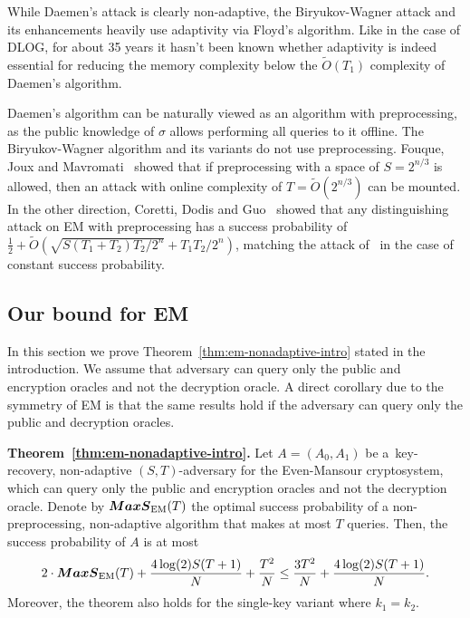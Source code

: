 \documentclass[11pt]{article}
\newcommand{\MAXS}{\boldsymbol{MaxS}}
\begin{document}
While Daemen's attack is clearly non-adaptive, the Biryukov-Wagner attack and its enhancements heavily use adaptivity via Floyd's algorithm. Like in the case of DLOG, for about 35 years it hasn't been known whether adaptivity is indeed essential for reducing the memory complexity below the $\tilde{O}(T_1)$ complexity of Daemen's algorithm. 

Daemen's algorithm can be naturally viewed as an algorithm with preprocessing, as the public knowledge of $\sigma$ allows performing all queries to it offline. The Biryukov-Wagner algorithm and its variants do not use preprocessing. Fouque, Joux and Mavromati~\cite{FouqueJM14} showed that if preprocessing with a space of $S=2^{n/3}$ is allowed, then an attack with online complexity of $T=\tilde{O}(2^{n/3})$ can be mounted. In the other direction, Coretti, Dodis and Guo~\cite{CorettiDG18} showed that any distinguishing attack on EM with preprocessing has a success probability of $\frac{1}{2}+ \tilde{O}(\sqrt{S(T_1+T_2)T_2/2^n}+T_1 T_2/2^n)$, matching the attack of~\cite{FouqueJM14} in the case of constant success probability. 

\subsection{Our bound for EM}

In this section we prove Theorem~\ref{thm:em-nonadaptive-intro} stated in the introduction. We assume that adversary can query only the public and encryption oracles and not the decryption oracle. A direct corollary due to the symmetry of EM is that the same results hold if the adversary can query only the public and decryption oracles.

\medskip \noindent \textbf{Theorem~\ref{thm:em-nonadaptive-intro}.}
Let $A=(A_0,A_1)$ be a~key-recovery, non-adaptive $(S,T)$-adversary for the Even-Mansour cryptosystem, which can query only the public and encryption oracles and not the decryption oracle. Denote by $\MAXS_{\textup{EM}}(T)$ the optimal success probability of a non-preprocessing, non-adaptive algorithm that makes at most $T$ queries. Then, the success probability of $A$ is at most
$$
2\cdot \MAXS_{\textup{EM}}(T) + \frac{4\log(2) S (T+1)}{N} + \frac{T^2}{N} \leq
    \frac{3T^2 }{N}  + \frac{4\log(2) S(T+1)}{N}.
$$
Moreover, the theorem also holds for the single-key variant where $k_1=k_2$.

\medskip
\end{document}
